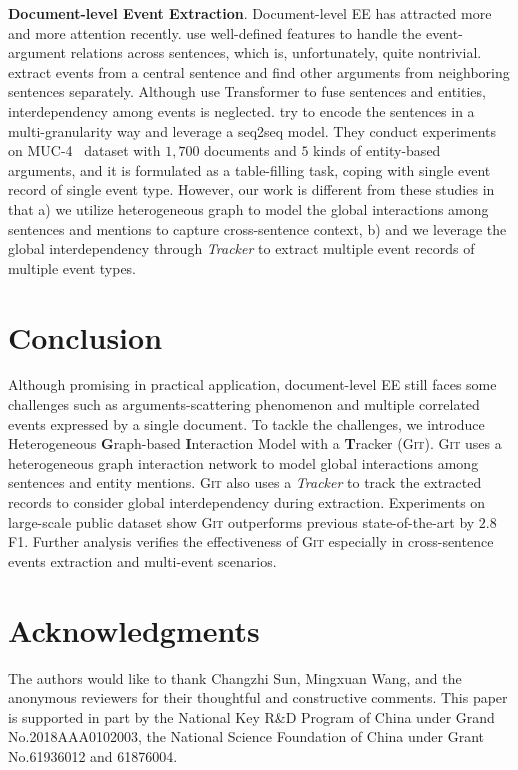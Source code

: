 \documentclass[11pt,a4paper]{article}
\newcommand{\modelname}{\textsc{Git}\xspace}
\begin{document}
\textbf{Document-level Event Extraction}.
Document-level EE has attracted more and more attention recently.
\citet{yang-mitchell-2016-joint} use well-defined features to handle the event-argument relations across sentences, which is, unfortunately, quite nontrivial.
\citet{yang-etal-2018-dcfee} extract events from a central sentence and find other arguments from neighboring sentences separately.
Although \citet{zheng-etal-2019-doc2edag} use Transformer to fuse sentences and entities, interdependency among events is neglected.
\citet{du-cardie-2020-document} try to encode the sentences in a multi-granularity way and \citet{DBLP:journals/corr/abs-2008-09249} leverage a seq2seq model.
They conduct experiments on MUC-4~\citep{muc} dataset with $1,700$ documents and $5$ kinds of entity-based arguments, and it is formulated as a table-filling task, coping with single event record of single event type.
However, our work is different from these studies in that
a) we utilize heterogeneous graph to model the global interactions among sentences and mentions to capture cross-sentence context,
b) and we leverage the global interdependency through \textit{Tracker} to extract multiple event records of multiple event types. \section{Conclusion}

Although promising in practical application, document-level EE still faces some challenges such as arguments-scattering phenomenon and multiple correlated events expressed by a single document.
To tackle the challenges, we introduce Heterogeneous \textbf{G}raph-based \textbf{I}nteraction Model with a \textbf{T}racker (\modelname).
\modelname uses a heterogeneous graph interaction network to model global interactions among sentences and entity mentions.
\modelname also uses a \textit{Tracker} to track the extracted records to consider global interdependency during extraction.
Experiments on large-scale public dataset \citep{zheng-etal-2019-doc2edag} show \modelname outperforms previous state-of-the-art by $2.8$ F1.
Further analysis verifies the effectiveness of \modelname especially in cross-sentence events extraction and multi-event scenarios.

 
\section*{Acknowledgments}
The authors would like to thank Changzhi Sun, Mingxuan Wang, and the anonymous reviewers for their thoughtful and constructive comments.
This paper is supported in part by the National Key R\&D Program of China under Grand No.2018AAA0102003, the National Science Foundation of China under Grant No.61936012 and 61876004.
\end{document}
